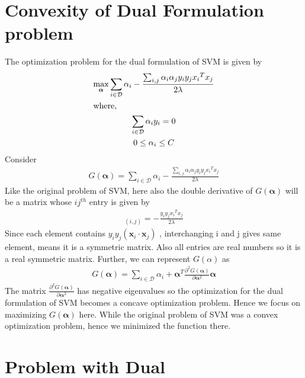 \documentclass[12pt]{article}
\begin{document}
\section{Convexity of Dual Formulation problem}
The optimization problem for the dual formulation of SVM is given by 
\begin{gather*}
    \max_{\boldsymbol{\alpha}} \sum_{i \in \mathcal{D}} \alpha_i - \frac{\sum_{i,j} \alpha_i \alpha_j y_i y_j {x_i}^T x_j }{2 \lambda} \\
    \intertext{where,}
     \sum_{i \in \mathcal{D}} \alpha_i y_i = 0 \\
     0 \leq \alpha_i \leq C
\end{gather*}
Consider
\begin{gather*}
  G(\boldsymbol{\alpha}) = \sum_{i \in \mathcal{D}} \alpha_i - \frac{\sum_{i,j} \alpha_i \alpha_j y_i y_j {x_i}^T x_j }{2 \lambda}
\end{gather*}
Like the original problem of SVM, here also the double derivative of $G(\boldsymbol{\alpha})$ will be a matrix whose $ij^{th}$ entry is given by
\begin{gather*}
    [\frac{\partial ^2 G(\boldsymbol{\alpha}) }{\partial \boldsymbol{\alpha}^2} ]_{(i,j)} = -\frac{y_i y_j {x_i}^T x_j }{2 \lambda}
\end{gather*}
Since each element contains $y_i y_j (\boldsymbol{x}_i \cdot\boldsymbol{x}_j)$ , interchanging i and j gives same element, means it is a symmetric matrix. Also all entries are real numbers so it is a real symmetric matrix. 
\newline Further, we can represent $G(\alpha)$ as 
 \begin{gather*}
  G(\boldsymbol{\alpha}) = \sum_{i \in \mathcal{D}} \alpha_i +{\boldsymbol{\alpha}}^T\frac{\partial ^2 G(\boldsymbol{\alpha}) }{\partial \boldsymbol{\alpha}^2}\boldsymbol{\alpha}
\end{gather*}
The matrix $\frac{\partial ^2 G(\boldsymbol{\alpha}) }{\partial \boldsymbol{\alpha}^2}$ has negative eigenvalues so the optimization for the dual formulation of SVM becomes a concave optimization problem. Hence we focus on maximizing $G(\boldsymbol{\alpha})$ here. While the original problem of SVM was a convex optimization problem, hence we minimized the function there.




\section{Problem with Dual}
\end{document}
